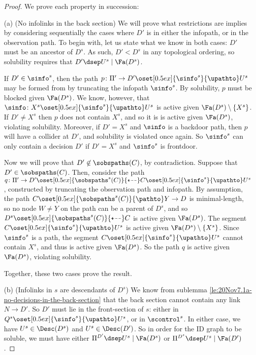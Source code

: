 \begin{proof} We prove each property in succession:

(a) (No infolinks in the back section) 
We will prove what restrictions are implies by considering sequentially the cases where 
$D'$ is in either the infopath, or in the observation path.
To begin with, let us state what we know in both cases:
$D'$ must be an ancestor of $D^s$. 
As such, $D'<D^s$ in any topological ordering, 
so solubility requires that $D' \dsep U^s \mid \Fa(D^s)$.

If $D' \in \sinfo^s$, then the path
$p\colon \Pi'\to D' \oset[0.5ex]{\sinfo^s}{\upathto} U^s$ may be
formed from by truncating the infopath $\sinfo^s$.
By solubility, $p$ must be blocked given $\Fa(D^s)$.
We know, however, that
$\sinfo\colon X^s \oset[0.5ex]{\sinfo^s}{\upathto} U^s$
is active given $\Fa({D^s}) \setminus \{X^s\}$.
If $D' \neq X^s$ then $p$ does not contain $X^s$, and so it is is active given $\Fa({D^s})$, 
violating solubility.
Moreover, if $D'=X^s$ and $\sinfo$ is a backdoor path, then $p$ will have a collider at $D'$, 
and solubility is violated once again.
So $\sinfo^s$ can only contain a decision $D'$ if $D'=X^s$ and $\sinfo^s$ is frontdoor.

Now we will prove that $D' \not \in \sobspaths(C)$, by contradiction.
Suppose that $D' \in \sobspaths(C)$.
Then, consider 
the path $q\colon \Pi'\to D' \oset[0.5ex]{\sobspaths^s(C)}{\dashleftarrow} C \oset[0.5ex]{\sinfo^s}{\upathto} U^s$,
constructed by truncating the observation path and infopath.
By assumption, the path $C\oset[0.5ex]{\sobspaths^s(C)}{\pathto} Y\to D$ is minimal-length, 
so no node $W\neq Y$ on the path can be a parent of $D^s$, 
and so $D^s \oset[0.5ex]{\sobspaths^s(C)}{\dashleftarrow} C$ is active given $\Fa(D^s)$.
The segment $C \oset[0.5ex]{\sinfo^s}{\upathto} U^s$ is active given $\Fa(D^s) \setminus \{X^s\}$.
Since $\sinfo^s$ is a path, the segment $C \oset[0.5ex]{\sinfo^s}{\upathto} U^s$ cannot contain $X^s$, 
and thus is active given $\Fa(D^s)$.
So the path $q$ is active given $\Fa(D^s)$, violating solubility.

Together, these two cases prove the result.

(b) (Infolinks in $s$ are descendants of $D^s$) 
We know from sublemma \ref{le:20Nov7.1a-no-decisions-in-the-back-section} that
the back section cannot contain any link $N \to D'$.
So $D'$ must lie in the front-section of $s$:
either in $Q^s \oset[0.5ex]{\sinfo^s}{\upathto}U^s$, or in $\scontrol^s$.
In either case, we have $U^s \in \Desc(D^s)$ and $U^s \in \Desc(D')$.
So in order for the ID graph to be soluble, 
we must have either $\Pi^{D'} \dsep U^s \mid \Fa(D^s)$ 
or $\Pi^{D^s} \dsep U^s \mid \Fa(D')$.



\end{proof}
